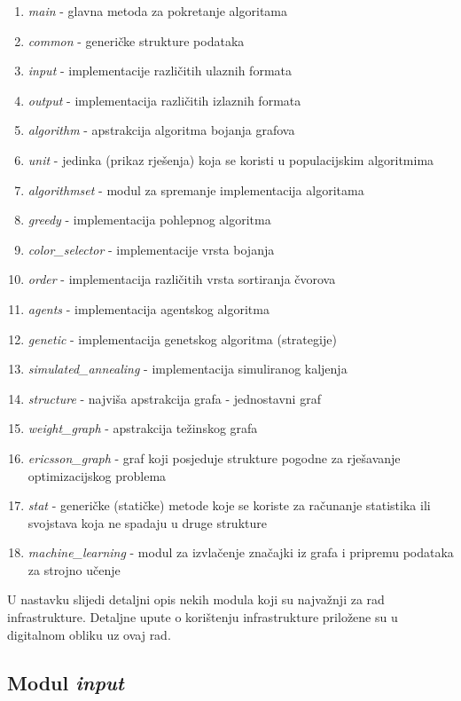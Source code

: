 \documentclass[times, utf8, diplomski, numeric]{fer}
\begin{document}
\begin{enumerate}
	\item \emph{main} - glavna metoda za pokretanje algoritama
	\item \emph{common} - generičke strukture podataka
	\item \emph{input} - implementacije različitih ulaznih formata
	\item \emph{output} - implementacija različitih izlaznih formata
	\item \emph{algorithm} - apstrakcija algoritma bojanja grafova
	\item \emph{unit} - jedinka (prikaz rješenja) koja se koristi u populacijskim algoritmima
	\item \emph{algorithmset} - modul za spremanje implementacija algoritama
	\item \emph{greedy} - implementacija pohlepnog algoritma
	\item \emph{color\_selector} - implementacije vrsta bojanja
	\item \emph{order} - implementacija različitih vrsta sortiranja čvorova
	\item \emph{agents} - implementacija agentskog algoritma
	\item \emph{genetic} - implementacija genetskog algoritma (strategije)
	\item \emph{simulated\_annealing} - implementacija simuliranog kaljenja
	\item \emph{structure} - najviša apstrakcija grafa - jednostavni graf
	\item \emph{weight\_graph} - apstrakcija težinskog grafa 
	\item \emph{ericsson\_graph} - graf koji posjeduje strukture pogodne za rješavanje optimizacijskog problema
	\item \emph{stat} - generičke (statičke) metode koje se koriste za računanje statistika ili svojstava koja ne spadaju u druge strukture
	\item \emph{machine\_learning} - modul za izvlačenje značajki iz grafa i pripremu podataka za strojno učenje
\end{enumerate}

U nastavku slijedi detaljni opis nekih modula koji su najvažnji za rad infrastrukture. Detaljne upute o korištenju infrastrukture priložene su u digitalnom obliku uz ovaj rad.

\subsection{Modul \emph{input}}
\end{document}
